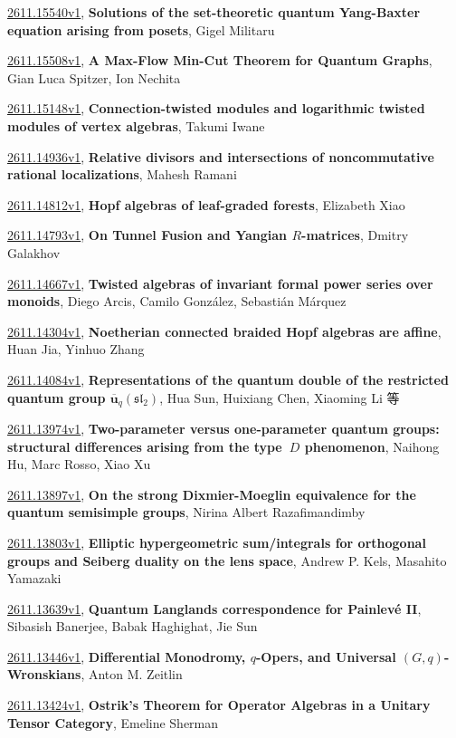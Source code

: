 \documentclass[9pt, a4paper]{article}
\theoremstyle{plain}
\theoremstyle{definition}
\theoremstyle{remark}
\newcommand{\arxiv}[3]{\href{https://arxiv.org/abs/#1}{#1}, \textbf{\textcolor{arxivblue}{#2}}, #3}
\begin{document}
\arxiv{2611.15540v1}{Solutions of the set-theoretic quantum Yang-Baxter equation arising from posets}{Gigel Militaru}

\arxiv{2611.15508v1}{A Max-Flow Min-Cut Theorem for Quantum Graphs}{Gian Luca Spitzer, Ion Nechita}

\arxiv{2611.15148v1}{Connection-twisted modules and logarithmic twisted modules of vertex algebras}{Takumi Iwane}

\arxiv{2611.14936v1}{Relative divisors and intersections of noncommutative rational localizations}{Mahesh Ramani}

\arxiv{2611.14812v1}{Hopf algebras of leaf-graded forests}{Elizabeth Xiao}

\arxiv{2611.14793v1}{On Tunnel Fusion and Yangian $R$-matrices}{Dmitry Galakhov}

\arxiv{2611.14667v1}{Twisted algebras of invariant formal power series over monoids}{Diego Arcis, Camilo González, Sebastián Márquez}

\arxiv{2611.14304v1}{Noetherian connected braided Hopf algebras are affine}{Huan Jia, Yinhuo Zhang}

\arxiv{2611.14084v1}{Representations of the quantum double of the restricted quantum group $\mathbf{\overline{u}}_q(\mathfrak{sl_2})$}{Hua Sun, Huixiang Chen, Xiaoming Li 等}

\arxiv{2611.13974v1}{Two-parameter versus one-parameter quantum groups: structural differences arising from the type~$D$ phenomenon}{Naihong Hu, Marc Rosso, Xiao Xu}

\arxiv{2611.13897v1}{On the strong Dixmier-Moeglin equivalence for the quantum semisimple groups}{Nirina Albert Razafimandimby}

\arxiv{2611.13803v1}{Elliptic hypergeometric sum/integrals for orthogonal groups and Seiberg duality on the lens space}{Andrew P. Kels, Masahito Yamazaki}

\arxiv{2611.13639v1}{Quantum Langlands correspondence for Painlevé II}{Sibasish Banerjee, Babak Haghighat, Jie Sun}

\arxiv{2611.13446v1}{Differential Monodromy, $q$-Opers, and Universal $(G,q)$-Wronskians}{Anton M. Zeitlin}

\arxiv{2611.13424v1}{Ostrik's Theorem for Operator Algebras in a Unitary Tensor Category}{Emeline Sherman}

\end{document}

